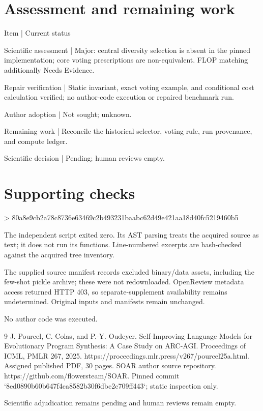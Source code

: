 \documentclass[10pt]{article}
\begin{document}
\section*{Assessment and remaining work}
Item | Current status\par
Scientific assessment | Major: central diversity selection is absent in the pinned implementation; core voting prescriptions are non-equivalent. FLOP matching additionally Needs Evidence.\par
Repair verification | Static invariant, exact voting example, and conditional cost calculation verified; no author-code execution or repaired benchmark run.\par
Author adoption | Not sought; unknown.\par
Remaining work | Reconcile the historical selector, voting rule, run provenance, and compute ledger.\par
Scientific decision | Pending; human reviews empty.\par
\section*{Supporting checks}
> 80a8e9cb2a78c8736e63469c2b493231baabc62d49e421aa18d40fc5219460b5\par
The independent script exited zero. Its AST parsing treats the acquired source as text; it does not run its functions. Line-numbered excerpts are hash-checked against the acquired tree inventory.\par
The supplied source manifest records excluded binary/data assets, including the few-shot pickle archive; these were not redownloaded. OpenReview metadata access returned HTTP 403, so separate-supplement availability remains undetermined. Original inputs and manifests remain unchanged.\par
No author code was executed.\par
9 J. Pourcel, C. Colas, and P.-Y. Oudeyer. Self-Improving Language Models for Evolutionary Program Synthesis: A Case Study on ARC-AGI. Proceedings of ICML, PMLR 267, 2025. https://proceedings.mlr.press/v267/pourcel25a.html. Assigned published PDF, 30 pages. SOAR author source repository. https://github.com/flowersteam/SOAR. Pinned commit `8ed0890b60b647f4ca8582b30f6dbc2c709ff443`; static inspection only.\par
Scientific adjudication remains pending and human reviews remain empty.\par
\end{document}
